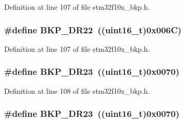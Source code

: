 Definition at line 107 of file stm32f10x\+\_\+bkp.\+h.

\subsubsection[{\texorpdfstring{B\+K\+P\+\_\+\+D\+R22}{BKP_DR22}}]{\setlength{\rightskip}{0pt plus 5cm}\#define B\+K\+P\+\_\+\+D\+R22~(({\bf uint16\+\_\+t})0x006\+C)}\hypertarget{group___data___backup___register_gab78636475b284bbaeb819d510cfcc397}{}\label{group___data___backup___register_gab78636475b284bbaeb819d510cfcc397}


Definition at line 107 of file stm32f10x\+\_\+bkp.\+h.

\subsubsection[{\texorpdfstring{B\+K\+P\+\_\+\+D\+R23}{BKP_DR23}}]{\setlength{\rightskip}{0pt plus 5cm}\#define B\+K\+P\+\_\+\+D\+R23~(({\bf uint16\+\_\+t})0x0070)}\hypertarget{group___data___backup___register_gafe53f4315942eeb540b307a2b534dc2a}{}\label{group___data___backup___register_gafe53f4315942eeb540b307a2b534dc2a}


Definition at line 108 of file stm32f10x\+\_\+bkp.\+h.

\subsubsection[{\texorpdfstring{B\+K\+P\+\_\+\+D\+R23}{BKP_DR23}}]{\setlength{\rightskip}{0pt plus 5cm}\#define B\+K\+P\+\_\+\+D\+R23~(({\bf uint16\+\_\+t})0x0070)}\hypertarget{group___data___backup___register_gafe53f4315942eeb540b307a2b534dc2a}{}\label{group___data___backup___register_gafe53f4315942eeb540b307a2b534dc2a}



